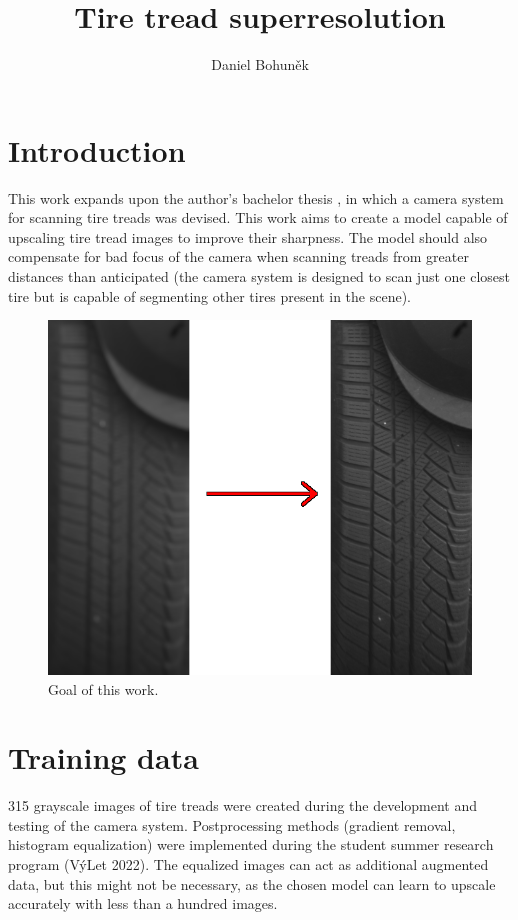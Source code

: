 \documentclass[english]{mvi-report}
\title{Tire tread superresolution}
\author{Daniel Bohuněk}
\affiliation{Czech Technical University - Faculty of Information Technology}
\begin{document}
\maketitle

\section{Introduction}
This work expands upon the author's bachelor thesis \cite{Bohunek2022}, in which a camera system for scanning tire treads was devised. This work aims to create a model capable of upscaling tire tread images to improve their sharpness. The model should also compensate for bad focus of the camera when scanning treads from greater distances than anticipated (the camera system is designed to scan just one closest tire but is capable of segmenting other tires present in the scene).

\begin{figure}[htpb]
  \centering
  \includegraphics[width=0.8\linewidth]{media/deblurring.png}
  \caption{Goal of this work.}
  \label{fig:deblurring}
\end{figure}

\section{Training data}
315 grayscale images of tire treads were created during the development and testing of the camera system. Postprocessing methods (gradient removal, histogram equalization) were implemented during the student summer research program (VýLet 2022). The equalized images can act as additional augmented data, but this might not be necessary, as the chosen model can learn to upscale accurately with less than a hundred images.
\end{document}
